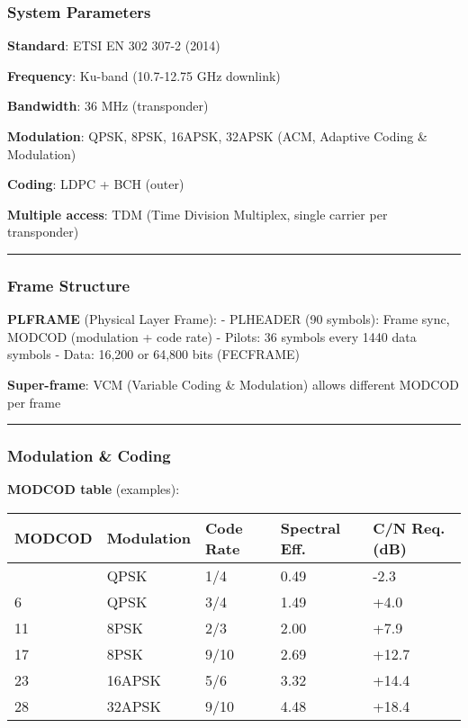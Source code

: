 \subsubsection{System Parameters}\label{system-parameters-2}

\textbf{Standard}: ETSI EN 302 307-2 (2014)

\textbf{Frequency}: Ku-band (10.7-12.75 GHz downlink)

\textbf{Bandwidth}: 36 MHz (transponder)

\textbf{Modulation}: QPSK, 8PSK, 16APSK, 32APSK (ACM, Adaptive Coding \&
Modulation)

\textbf{Coding}: LDPC + BCH (outer)

\textbf{Multiple access}: TDM (Time Division Multiplex, single carrier
per transponder)

\begin{center}\rule{0.5\linewidth}{0.5pt}\end{center}

\subsubsection{Frame Structure}\label{frame-structure-1}

\textbf{PLFRAME} (Physical Layer Frame): - PLHEADER (90 symbols): Frame
sync, MODCOD (modulation + code rate) - Pilots: 36 symbols every 1440
data symbols - Data: 16,200 or 64,800 bits (FECFRAME)

\textbf{Super-frame}: VCM (Variable Coding \& Modulation) allows
different MODCOD per frame

\begin{center}\rule{0.5\linewidth}{0.5pt}\end{center}

\subsubsection{Modulation \& Coding}\label{modulation-coding-1}

\textbf{MODCOD table} (examples):

{\def\LTcaptype{} %
\begin{longtable}[]{@{}lllll@{}}
\toprule\noalign{}
MODCOD & Modulation & Code Rate & Spectral Eff. & C/N Req. (dB) \\
\midrule\noalign{}
\endhead
\bottomrule\noalign{}
\endlastfoot
1 & QPSK & 1/4 & 0.49 & -2.3 \\
6 & QPSK & 3/4 & 1.49 & +4.0 \\
11 & 8PSK & 2/3 & 2.00 & +7.9 \\
17 & 8PSK & 9/10 & 2.69 & +12.7 \\
23 & 16APSK & 5/6 & 3.32 & +14.4 \\
28 & 32APSK & 9/10 & 4.48 & +18.4 \\
\end{longtable}
}

